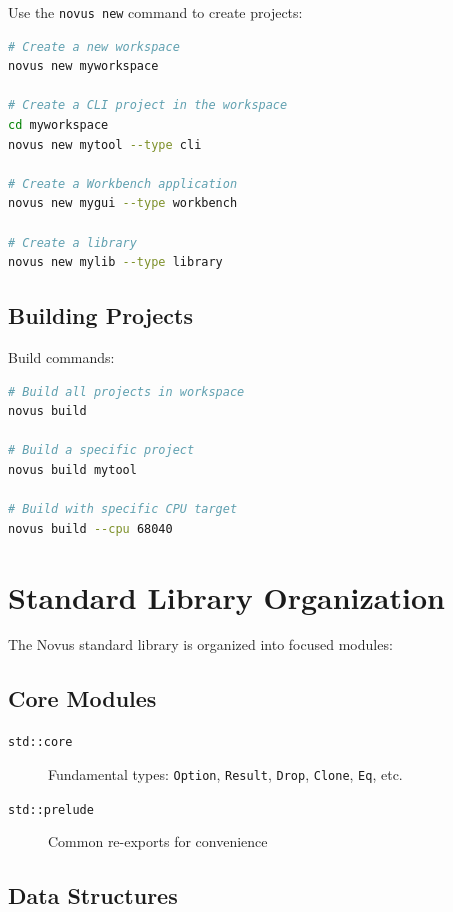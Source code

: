 Use the \texttt{novus new} command to create projects:

\begin{lstlisting}[language=bash]
# Create a new workspace
novus new myworkspace

# Create a CLI project in the workspace
cd myworkspace
novus new mytool --type cli

# Create a Workbench application
novus new mygui --type workbench

# Create a library
novus new mylib --type library
\end{lstlisting}

\subsection{Building Projects}
\label{subsec:building-projects}

Build commands:

\begin{lstlisting}[language=bash]
# Build all projects in workspace
novus build

# Build a specific project
novus build mytool

# Build with specific CPU target
novus build --cpu 68040
\end{lstlisting}

\section{Standard Library Organization}
\label{sec:stdlib-org}

The Novus standard library is organized into focused modules:

\subsection{Core Modules}
\label{subsec:core-modules}

\begin{description}
    \item[\texttt{std::core}] Fundamental types: \texttt{Option}, \texttt{Result}, \texttt{Drop}, \texttt{Clone}, \texttt{Eq}, etc.
    \item[\texttt{std::prelude}] Common re-exports for convenience
\end{description}

\subsection{Data Structures}
\label{subsec:data-structures}

